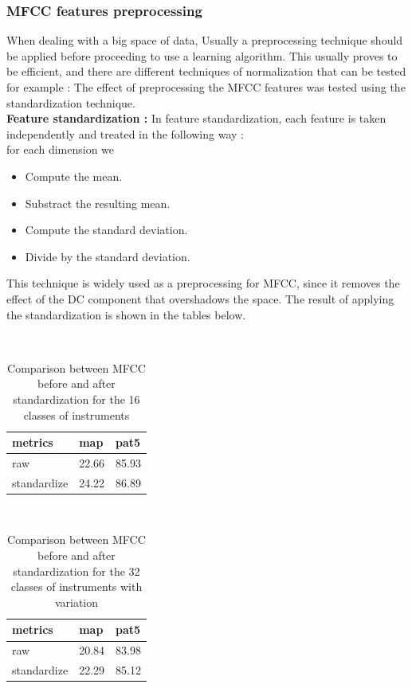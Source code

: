 \documentclass[hidelinks,12pt]{report}
\begin{document}
\subsubsection{MFCC features preprocessing}
When dealing with a big space of data, Usually a preprocessing technique should be applied before proceeding to use a learning algorithm. This usually proves to be efficient, and there are  different techniques of normalization that can be tested for example :   The effect of preprocessing the MFCC features was tested using the standardization technique.\\
\textbf{Feature standardization :}
In feature standardization, each feature is taken independently and treated in the following way : \\
for each dimension we
\begin{itemize}
\item Compute the mean.
\item Substract the resulting mean.
\item Compute the standard deviation.
\item Divide by the standard deviation.
\end{itemize}
This technique is widely used as a preprocessing for MFCC, since it removes the effect of the DC component that overshadows the space. The result of applying the standardization is shown in the tables below.
\begin{table}[H] 
\begin{center} 
\ 
 \setlength{\tabcolsep}{.16667em} 
\begin{tabular}{|l|l|l|} 
metrics & map & pat5  \\ 
\hline 
raw & 22.66 & 85.93  \\ 
standardize & 24.22 & 86.89  \\ 
 
\end{tabular} 
\end{center} 
\caption{Comparison between MFCC before and after standardization for the 16 classes of instruments} 
\label{me} 
\end{table}

\begin{table}[H]
\begin{center} 
\ 
 \setlength{\tabcolsep}{.16667em} 
\begin{tabular}{|l|l|l|} 
metrics & map & pat5 \\ 
\hline 
raw & 20.84 & 83.98 \\ 
standardize & 22.29 & 85.12  \\ 

\end{tabular} 
\end{center} 
\caption{Comparison between MFCC before and after standardization for the 32 classes of instruments with variation} 
\label{me} 
\end{table} 
\end{document}
